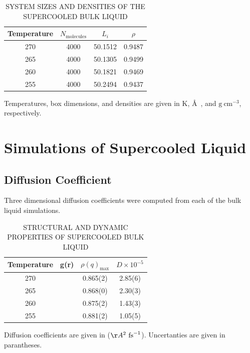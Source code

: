 \begin{table}[h] \centering \caption{SYSTEM SIZES AND DENSITIES OF THE SUPERCOOLED BULK LIQUID\label{tab:qll-liquid}}
\begin{tabular}{cccc}
\hline
\hline
 Temperature & $N_\mathrm{molecules}$ & $L_i$ & $\rho$\\
\hline
270 & 4000 & 50.1512 & 0.9487 \\
265 & 4000 & 50.1305 & 0.9499 \\
260 & 4000 & 50.1821 & 0.9469 \\
255 & 4000 & 50.2494 & 0.9437 \\
\hline
\hline
\end{tabular}
\begin{flushleft}
Temperatures, box dimensions, and densities are given in K, \AA~, and
$\mathrm{g}~\mathrm{cm}^{-3}$, respectively.
\end{flushleft}
\end{table}

\section{Simulations of Supercooled Liquid}
\subsection{Diffusion Coefficient}
Three dimensional diffusion coefficients were computed from each of the
bulk liquid simulations. 


\begin{table}[h] \centering \caption{STRUCTURAL AND DYNAMIC PROPERTIES
    OF SUPERCOOLED BULK LIQUID\label{tab:qll-liquid}}
\begin{tabular}{cccc}
\hline
\hline
 Temperature & g(r) & $\rho (q)_{\mathrm{max}}$& $D\times 10^{-5}$\\
\hline
270 & &0.865(2) & 2.85(6)\\
265 & &0.868(0) & 2.30(3)\\
260 & &0.875(2) & 1.43(3)\\
255 & &0.881(2) & 1.05(5) \\
\hline
\hline
\end{tabular}
\begin{flushleft}
Diffusion coefficients are given in ($\AA^2~\mathrm{fs}^{-1}$). Uncertanties are given in parantheses.
\end{flushleft}
\end{table}


